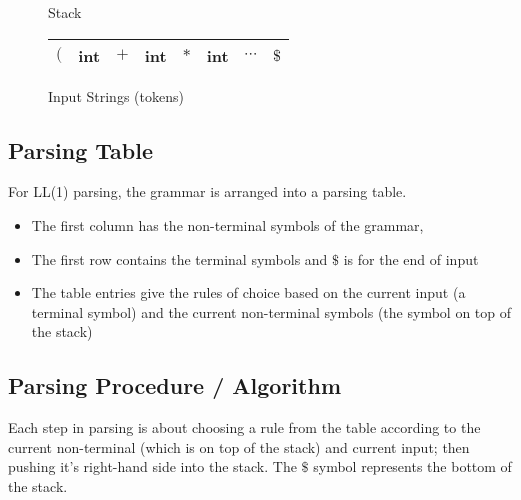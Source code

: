 \begin{minipage}{0.2\textwidth}
    \begin{figure}[H]
        \centering
        \usetikzlibrary{shapes.multipart}
        \caption{Stack}
    \end{figure}
\end{minipage}\hfill
\begin{minipage}{0.75\textwidth}
    \begin{figure}[H]
        \centering
        \begin{tabular}[H]{| C{0.08\textwidth} | C{0.08\textwidth} | C{0.08\textwidth} | C{0.08\textwidth} | C{0.08\textwidth} | C{0.08\textwidth} | C{0.08\textwidth} | C{0.08\textwidth} |}
            \hline
            $($ & int & $+$ & int & $*$ & int & $\cdots$ & $\$ $\\
            \hline
        \end{tabular}
        \caption{Input Strings (tokens)}
\end{figure}
\end{minipage}

\subsection{Parsing Table}
For LL(1) parsing, the grammar is arranged into a parsing table.
\begin{itemize}
    \item The first column has the non-terminal symbols of the grammar,
    \item The first row contains the terminal symbols and $\$$ is for the end of input 
    \item The table entries give the rules of choice based on the current input (a terminal symbol) and the current non-terminal symbols (the symbol on top of the stack)
\end{itemize}


\subsection{Parsing Procedure / Algorithm}
Each step in parsing is about choosing a rule from the table according to the current non-terminal (which is on top of the stack) and current input; then pushing it's right-hand side into the stack. The $\$$ symbol represents the bottom of the stack. \\

